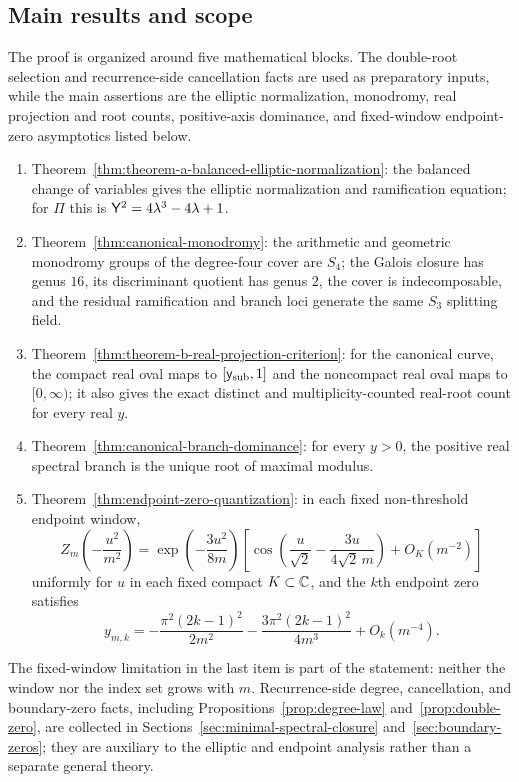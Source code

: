 \subsection*{Main results and scope}

The proof is organized around five mathematical blocks.  The double-root selection and recurrence-side cancellation facts are used as preparatory inputs, while the main assertions are the elliptic normalization, monodromy, real projection and root counts, positive-axis dominance, and fixed-window endpoint-zero asymptotics listed below.
\begin{enumerate}
\item Theorem~\ref{thm:theorem-a-balanced-elliptic-normalization}: the balanced change of variables gives the elliptic normalization and ramification equation; for $\Pi$ this is $\mathsf{Y}^2=4\lambda^3-4\lambda+1$.
\item Theorem~\ref{thm:canonical-monodromy}: the arithmetic and geometric monodromy groups of the degree-four cover are $S_4$; the Galois closure has genus $16$, its discriminant quotient has genus $2$, the cover is indecomposable, and the residual ramification and branch loci generate the same $S_3$ splitting field.
\item Theorem~\ref{thm:theorem-b-real-projection-criterion}: for the canonical curve, the compact real oval maps to $[\mathsf{y}_{\mathrm{sub}},1]$ and the noncompact real oval maps to $[0,\infty)$; it also gives the exact distinct and multiplicity-counted real-root count for every real $y$.
\item Theorem~\ref{thm:canonical-branch-dominance}: for every $y>0$, the positive real spectral branch is the unique root of maximal modulus.
\item Theorem~\ref{thm:endpoint-zero-quantization}: in each fixed non-threshold endpoint window,
\[
Z_m\!\left(-\frac{u^2}{m^2}\right)=
\exp\!\left(-\frac{3u^2}{8m}\right)
\left[\cos\!\left(\frac{u}{\sqrt2}-\frac{3u}{4\sqrt2\,m}\right)+O_K(m^{-2})\right]
\]
uniformly for $u$ in each fixed compact $K\subset\mathbb{C}$, and the $k$th endpoint zero satisfies
\[
y_{m,k}= -\frac{\pi^2(2k-1)^2}{2m^2}-\frac{3\pi^2(2k-1)^2}{4m^3}+O_k(m^{-4}).
\]
\end{enumerate}
The fixed-window limitation in the last item is part of the statement: neither the window nor the index set grows with $m$.
Recurrence-side degree, cancellation, and boundary-zero facts, including Propositions~\ref{prop:degree-law} and~\ref{prop:double-zero}, are collected in Sections~\ref{sec:minimal-spectral-closure} and~\ref{sec:boundary-zeros}; they are auxiliary to the elliptic and endpoint analysis rather than a separate general theory.
